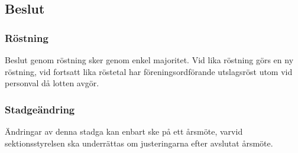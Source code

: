 \documentclass[11pt, noincludeaddress]{classes/cthit}
\begin{document}
\subsection{Beslut}

\subsubsection{Röstning}
Beslut genom röstning sker genom enkel majoritet. Vid lika röstning görs en ny röstning, vid fortsatt lika röstetal har föreningsordförande utslagsröst utom vid personval då lotten avgör. 

\subsubsection{Stadgeändring}
Ändringar av denna stadga kan enbart ske på ett årsmöte, varvid sektionsstyrelsen ska underrättas om justeringarna efter avslutat årsmöte. 
\end{document}
